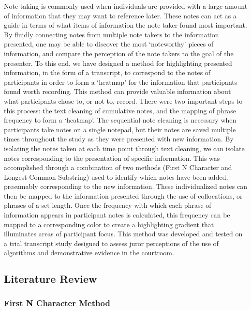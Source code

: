 \documentclass[print]{nuthesis}
\begin{document}
Note taking is commonly used when individuals are provided with a large amount of information that they may want to reference later.
These notes can act as a guide in terms of what items of information the note taker found most important.
By fluidly connecting notes from multiple note takers to the information presented, one may be able to discover the most `noteworthy' pieces of information, and compare the perception of the note takers to the goal of the presenter.
To this end, we have designed a method for highlighting presented information, in the form of a transcript, to correspond to the notes of participants in order to form a `heatmap' for the information that participants found worth recording. This method can provide valuable information about what participants chose to, or not to, record.
There were two important steps to this process: the text cleaning of cumulative notes, and the mapping of phrase frequency to form a `heatmap'.
The sequential note cleaning is necessary when participants take notes on a single notepad, but their notes are saved multiple times throughout the study as they were presented with new information.
By isolating the notes taken at each time point through text cleaning, we can isolate notes corresponding to the presentation of specific information.
This was accomplished through a combination of two methods (First N Character and Longest Common Substring) used to identify which notes have been added, presumably corresponding to the new information.
These individualized notes can then be mapped to the information presented through the use of collocations, or phrases of a set length.
Once the frequency with which each phrase of information appears in participant notes is calculated, this frequency can be mapped to a corresponding color to create a highlighting gradient that illuminates areas of participant focus.
This method was developed and tested on a trial transcript study designed to assess juror perceptions of the use of algorithms and demonstrative evidence in the courtroom.

\hypertarget{literature-review}{%
\subsection{Literature Review}\label{literature-review}}

\hypertarget{first-n-character-method}{%
\subsubsection{First N Character Method}\label{first-n-character-method}}
\end{document}
